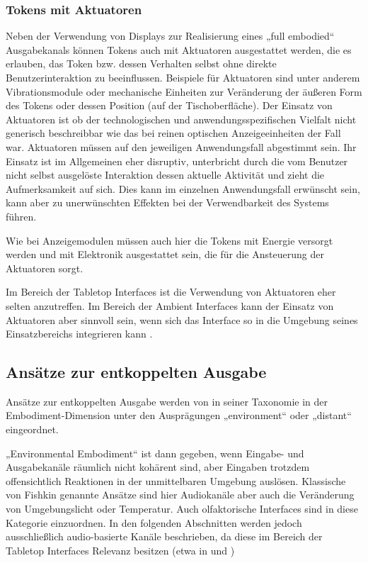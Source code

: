 
\subsubsection{Tokens mit Aktuatoren} %
\label{ssub:tokens_mit_aktuatoren}

Neben der Verwendung von Displays zur Realisierung eines „full embodied“ Ausgabekanals können Tokens auch mit Aktuatoren ausgestattet werden, die es erlauben, das Token bzw. dessen Verhalten selbst ohne direkte Benutzerinteraktion zu beeinflussen. Beispiele für Aktuatoren sind unter anderem Vibrationsmodule oder mechanische Einheiten zur Veränderung der äußeren Form des Tokens oder dessen Position (auf der Tischoberfläche). Der Einsatz von Aktuatoren ist ob der technologischen und anwendungsspezifischen Vielfalt nicht generisch beschreibbar wie das bei reinen optischen Anzeigeeinheiten der Fall war. Aktuatoren müssen auf den jeweiligen Anwendungsfall abgestimmt sein. Ihr Einsatz ist im Allgemeinen eher disruptiv, unterbricht durch die vom Benutzer nicht selbst ausgelöste Interaktion dessen aktuelle Aktivität und zieht die Aufmerksamkeit auf sich. Dies kann im einzelnen Anwendungsfall erwünscht sein, kann aber zu unerwünschten Effekten bei der Verwendbarkeit des Systems führen.

Wie bei Anzeigemodulen müssen auch hier die Tokens mit Energie versorgt werden und mit Elektronik ausgestattet sein, die für die Ansteuerung der Aktuatoren sorgt.

Im Bereich der Tabletop Interfaces ist die Verwendung von Aktuatoren eher selten anzutreffen. Im Bereich der Ambient Interfaces kann der Einsatz von Aktuatoren aber sinnvoll sein, wenn sich das Interface so in die Umgebung seines Einsatzbereichs integrieren kann \citep{Gross03}.


\subsection{Ansätze zur entkoppelten Ausgabe} %
\label{sub:entkoppelte_ausgabe}

Ansätze zur entkoppelten Ausgabe werden von \citet{Fishkin04} in seiner Taxonomie in der Embodiment-Dimension unter den Ausprägungen „environment“ oder „distant“ eingeordnet. 

„Environmental Embodiment“ ist dann gegeben, wenn Eingabe- und Ausgabekanäle räumlich nicht kohärent sind, aber Eingaben trotzdem offensichtlich Reaktionen in der unmittelbaren Umgebung auslösen. Klassische von Fishkin genannte Ansätze sind hier Audiokanäle aber auch die Veränderung von Umgebungslicht oder Temperatur. Auch olfaktorische Interfaces sind in diese Kategorie einzuordnen. In den folgenden Abschnitten werden jedoch ausschließlich audio-basierte Kanäle beschrieben, da diese im Bereich der Tabletop Interfaces Relevanz besitzen (etwa in \citep{Kaltenbrunner06} und \citep{Pedersen09})


